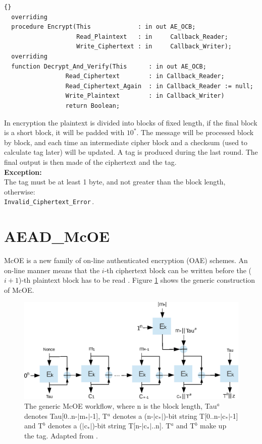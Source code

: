 \hhline
\begin{lstlisting}{}
  overriding
  procedure Encrypt(This             : in out AE_OCB;
                    Read_Plaintext   : in     Callback_Reader;
                    Write_Ciphertext : in     Callback_Writer);
  overriding
  function Decrypt_And_Verify(This      : in out AE_OCB;
                 Read_Ciphertext        : in Callback_Reader;
                 Read_Ciphertext_Again  : in Callback_Reader := null;
                 Write_Plaintext        : in Callback_Writer)
                 return Boolean;
\end{lstlisting}
In encryption the plaintext is divided into blocks of fixed length, if
the final block is a short block, it will be padded with $10^*$. The
message will be processed block by block, and each time an
intermediate cipher block and a checksum (used to calculate tag later)
will be updated. A tag is produced during the last round. The final
output is then made of the ciphertext and the tag.\\

\noindent\textbf{Exception:}\\ The tag must be at least 1 byte, and
not greater than the block length,
otherwise:\\ \texttt{Invalid\_Ciphertext\_Error}\,.


\section{AEAD\_McOE}
McOE is a new family of on-line authenticated encryption (OAE)
schemes. An on-line manner means that the $i$-th ciphertext block can
be written before the ($i+1$)-th plaintext block has to be read
\cite{DBLP:conf/fse/FleischmannFL12}. Figure \ref{Mc} shows the
generic construction of McOE.
\begin{figure}[htp]
\centering
\includegraphics[scale=0.9]{./images/AE_McOE}
\caption{The generic McOE workflow, where n is the block length,
  Tau$^a$ denotes Tau[0..n-$|$m$_*|$-1], T$^a$ denotes a
  (n-$|$c$_*|$)-bit string T[0..n-$|$c$_*|$-1] and T$^b$ denotes a
  ($|$c$_*|$)-bit string T[n-$|$c$_*|$..n]. T$^a$ and T$^b$ make up
  the tag.  Adapted from
  \cite{DBLP:conf/fse/FleischmannFL12}.}\label{Mc}
\end{figure}

